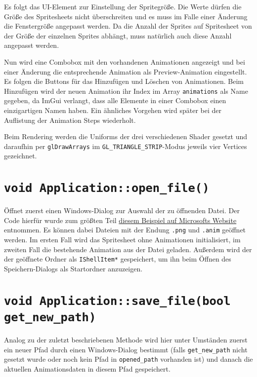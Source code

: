 Es folgt das UI-Element zur Einstellung der Spritegröße. Die Werte dürfen die Größe des Spritesheets nicht überschreiten und es muss im Falle einer Änderung die Fenstergröße angepasst werden. Da die Anzahl der Sprites auf Spritesheet von der Größe der einzelnen Sprites abhängt, muss natürlich auch diese Anzahl angepasst werden. 

Nun wird eine Combobox mit den vorhandenen Animationen angezeigt und bei einer Änderung die entsprechende Animation als Preview-Animation eingestellt. Es folgen die Buttons für das Hinzufügen und Löschen von Animationen. Beim Hinzufügen wird der neuen Animation ihr Index im Array \lstinline{animations} als Name gegeben, da ImGui verlangt, dass alle Elemente in einer Combobox einen einzigartigen Namen haben. Ein ähnliches Vorgehen wird später bei der Auflistung der Animation Steps wiederholt. 

Beim Rendering werden die Uniforms der drei verschiedenen Shader gesetzt und daraufhin per \lstinline{glDrawArrays} im \lstinline{GL_TRIANGLE_STRIP}-Modus jeweils vier Vertices gezeichnet. 

\section{\lstinline{void Application::open_file()}}
Öffnet zuerst einen Windows-Dialog zur Auswahl der zu öffnenden Datei. Der Code hierfür wurde zum größten Teil \href{https://docs.microsoft.com/en-us/windows/win32/learnwin32/example--the-open-dialog-box}{diesem Beispiel auf Microsofts Website} entnommen. Es können dabei Dateien mit der Endung \lstinline{.png} und \lstinline{.anim} geöffnet werden. Im ersten Fall wird das Spritesheet ohne Animationen initialisiert, im zweiten Fall die bestehende Animation aus der Datei geladen. Außerdem wird der der geöffnete Ordner als \lstinline{IShellItem*} gespeichert, um ihn beim Öffnen des Speichern-Dialogs als Startordner anzuzeigen.

\section{\lstinline{void Application::save_file(bool get_new_path)}}
Analog zu der zuletzt beschriebenen Methode wird hier unter Umständen zuerst ein neuer Pfad durch einen Windows-Dialog bestimmt (falls \lstinline{get_new_path} nicht gesetzt wurde oder noch kein Pfad in \lstinline{opened_path} vorhanden ist) und danach die aktuellen Animationsdaten in diesem Pfad gespeichert.

